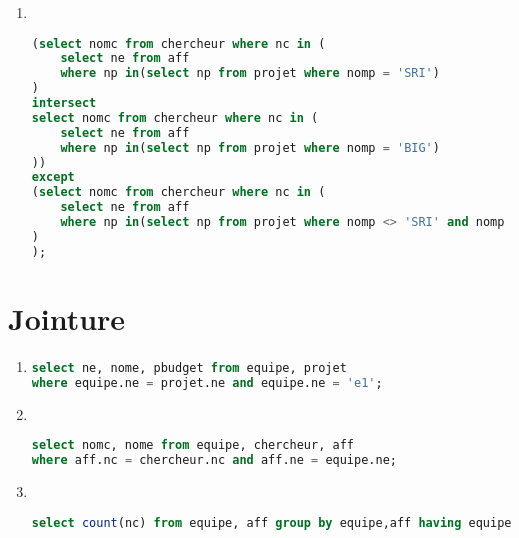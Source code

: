 \begin{enumerate}
{	L'utilisation des opérateurs ensembliste est indispensable, chercher ensuite une requete non ensembliste}
	\begin{lstlisting}[language=SQL, numbers=none]
select nomc from chercheur where nc in (
	select ne from aff 
	where np in(select np from projet where nomp = 'SRI')
)
intersect
select nomc from chercheur where nc in (
	select ne from aff 
	where np in(select np from projet where nomp = 'BIG')
)
	\end{lstlisting}
\item ~ 
	\begin{lstlisting}[language=SQL, numbers=none]
(select nomc from chercheur where nc in (
	select ne from aff 
	where np in(select np from projet where nomp = 'SRI')
)
intersect
select nomc from chercheur where nc in (
	select ne from aff 
	where np in(select np from projet where nomp = 'BIG')
))
except
(select nomc from chercheur where nc in (
	select ne from aff 
	where np in(select np from projet where nomp <> 'SRI' and nomp <> 'BIG')
)
);
	\end{lstlisting}
\end{enumerate}

\chapter{Jointure}
\begin{enumerate}
	\item 
	\begin{lstlisting}[language=SQL, numbers=none]
select ne, nome, pbudget from equipe, projet 
where equipe.ne = projet.ne and equipe.ne = 'e1';
	\end{lstlisting}
\item ~ 
	\begin{lstlisting}[language=SQL, numbers=none]
select nomc, nome from equipe, chercheur, aff 
where aff.nc = chercheur.nc and aff.ne = equipe.ne;
	\end{lstlisting}
\item ~
	\begin{lstlisting}[language=SQL, numbers=none]
select count(nc) from equipe, aff group by equipe,aff having equipe.nc = aff.nc
	\end{lstlisting}
\end{enumerate}


